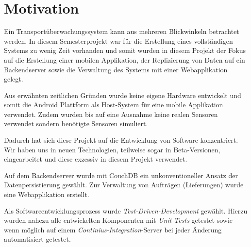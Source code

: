 \section{Motivation}

Ein Transportüberwachungssystem kann aus mehreren Blickwinkeln betrachtet werden.
	In diesem Semesterprojekt war für die Erstellung eines vollständigen
	Systems zu wenig Zeit vorhanden und somit wurden in diesem Projekt der Fokus
	auf die Erstellung einer mobilen Applikation, der Replizierung von Daten auf
	ein Backendserver sowie die Verwaltung des Systems mit einer Webapplikation
	gelegt.
	
Aus erwähnten zeitlichen Gründen wurde keine eigene Hardware entwickelt und somit
	die Android Plattform als Host-System für eine mobile Applikation verwendet.
	Zudem wurden bis auf eine Ausnahme keine realen Sensoren verwendet sondern
	benötigte Sensoren simuliert.

Dadurch hat sich diese Projekt auf die Entwicklung von Software konzentriert.
	Wir haben uns in neuen Technologien, teilweise sogar in Beta-Versionen,
	eingearbeitet und diese exzessiv in diesem Projekt verwendet.
	
Auf dem Backendserver wurde mit CouchDB ein unkonventioneller Ansatz der
	Datenpersistierung gewählt. Zur Verwaltung von Aufträgen (Lieferungen)
	wurde eine Webapplikation erstellt.

Als Softwareentwicklungsprozess wurde \emph{Test-Driven-Development} gewählt.
	Hierzu wurden nahezu alle entwickelten Komponenten mit \emph{Unit-Tests}
	getestet sowie wenn möglich auf einem \emph{Continius-Integration}-Server
	bei jeder Änderung automatisiert getestet.
